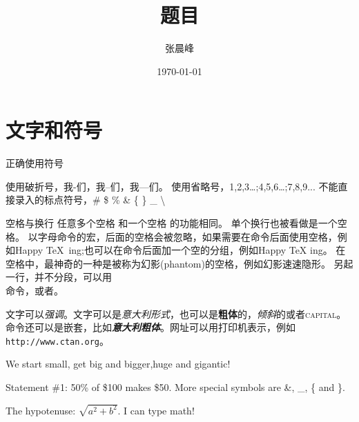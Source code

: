 \documentclass[UTF8,a4paper,12pt]{article}
\title{题目}
\author{张晨峰}
\date{\today}
\begin{document}
\maketitle

\section{文字和符号}

正确使用符号

使用破折号，我-们，我--们，我---们。
使用省略号，1,2,3\ldots;4,5,6\dots;7,8,9...
不能直接录入的标点符号，\# \quad \$ \quad \% \quad \& \quad \{ \quad \} \quad \_ \quad \textbackslash

空格与换行
任意多个空格     和一个空格 的功能相同。
单个换行也被看做是一个空格。
以字母命令的宏，后面的空格会被忽略，如果需要在命令后面使用空格，例如Happy \TeX\ ing;也可以在命令后面加一个空的分组{}，例如Happy \TeX{} ing。
在空格中，最神奇的一种是被称为幻影(phantom)的空格，例如幻影\phantom{我是空格}速速隐形。
另起一行，并不分段，可以用\\命令，或者。


文字可以\emph{强调}。文字可以是\textit{意大利形式}，也可以是\textbf{粗体}的，\textsl{倾斜}的或者\textsc{capital}。
命令还可以是嵌套，比如\textit{\textbf{意大利粗体}}。网址可以用打印机表示，例如\texttt{http://www.ctan.org}。

\noindent\tiny We \scriptsize start \footnotesize \small small,
\normalsize get \large big \Large and \LARGE bigger,\huge huge and \Huge gigantic!

\normalsize Statement \#1:
50\% of \$100 makes \$50.
More special symbols are \&, \_, \{ and \}.

The hypotenuse: $\sqrt{a^{2} + b^{2}}$. I can type math!
\end{document}
